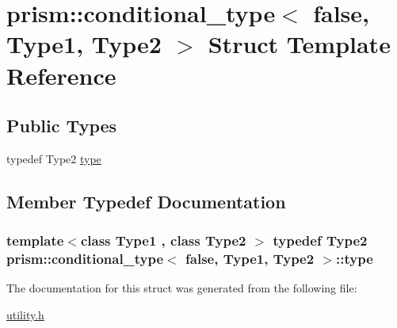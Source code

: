 \hypertarget{structprism_1_1conditional__type_3_01false_00_01_type1_00_01_type2_01_4}{}\section{prism\+:\+:conditional\+\_\+type$<$ false, Type1, Type2 $>$ Struct Template Reference}
\label{structprism_1_1conditional__type_3_01false_00_01_type1_00_01_type2_01_4}
\subsection*{Public Types}
\begin{DoxyCompactItemize}
\item 
typedef Type2 \hyperlink{structprism_1_1conditional__type_3_01false_00_01_type1_00_01_type2_01_4_ab06b40a3cd6b35aa1871c1c8e6d7930f}{type}
\end{DoxyCompactItemize}


\subsection{Member Typedef Documentation}
\subsubsection[{\texorpdfstring{type}{type}}]{\setlength{\rightskip}{0pt plus 5cm}template$<$class Type1 , class Type2 $>$ typedef Type2 {\bf prism\+::conditional\+\_\+type}$<$ false, Type1, Type2 $>$\+::{\bf type}}\hypertarget{structprism_1_1conditional__type_3_01false_00_01_type1_00_01_type2_01_4_ab06b40a3cd6b35aa1871c1c8e6d7930f}{}\label{structprism_1_1conditional__type_3_01false_00_01_type1_00_01_type2_01_4_ab06b40a3cd6b35aa1871c1c8e6d7930f}


The documentation for this struct was generated from the following file\+:\begin{DoxyCompactItemize}
\item 
\hyperlink{utility_8h}{utility.\+h}\end{DoxyCompactItemize}
